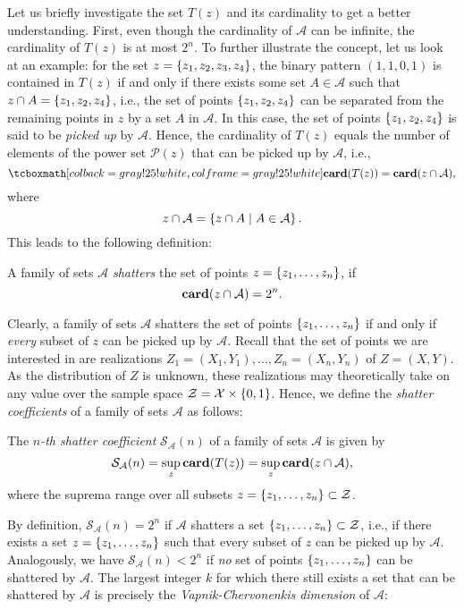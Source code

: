 Let us briefly investigate the set $T(z)$ and its cardinality to get a better understanding. First, even though the cardinality of $\mathcal{A}$ can be infinite, the cardinality of $T(z)$ is at most $2^n$. To further illustrate the concept, let us look at an example: for the set $z = \left\{z_1, z_2, z_3, z_4\right\}$, the binary pattern $(1, 1, 0, 1)$ is contained in $T(z)$ if and only if there exists some set $A \in \mathcal{A}$ such that $z \cap A = \left\{z_1, z_2, z_4\right\}$, i.e., the set of points $\left\{z_1, z_2, z_4\right\}$ can be separated from the remaining points in $z$ by a set $A$ in $\mathcal{A}$. In this case, the set of points $\left\{z_1, z_2, z_4\right\}$ is said to be \emph{picked up} by $\mathcal{A}$. Hence, the cardinality of $T(z)$ equals the number of elements of the power set $\mathcal{P}(z)$ that can be picked up by $\mathcal{A}$, i.e.,
\[
    \highlightMath{
        \card{T(z)} = \card{z \cap \mathcal{A}},
    }
\]
where
\[
    z \cap \mathcal{A} = \left\{ z \cap A \mathrel{|} A \in \mathcal{A}\right\}.
\]
This leads to the following definition:

\begin{definition}
A family of sets $\mathcal{A}$ \emph{shatters} the set of points $z = \left\{z_1, \dots, z_n\right\}$, if
\[
    \mathrm{\mathbf{card}}(z \cap \mathcal{A}) = 2^n.
\]
\end{definition}

Clearly, a family of sets $\mathcal{A}$ shatters the set of points $\left\{z_1, \dots, z_n\right\}$ if and only if \emph{every} subset of $z$ can be picked up by $\mathcal{A}$. Recall that the set of points we are interested in are realizations $Z_1 = (X_1, Y_1), \dots, Z_n = (X_n, Y_n)$ of $Z = (X, Y)$. As the distribution of $Z$ is unknown, these realizations may theoretically take on any value over the sample space $\mathcal{Z} = \mathcal{X} \times \left\{0, 1\right\}$. Hence, we define the \emph{shatter coefficients} of a family of sets $\mathcal{A}$ as follows:

\begin{definition}
The \emph{$n$-th shatter coefficient} $\mathcal{S}_{\mathcal{A}}(n)$ of a family of sets $\mathcal{A}$ is given by
\[
    \mathcal{S}_{\mathcal{A}}(n) = \sup_z \mathrm{\mathbf{card}}(T(z)) = \sup_z \mathrm{\mathbf{card}}(z \cap \mathcal{A}),
\]
where the suprema range over all subsets $z = \left\{z_1, \dots, z_n\right\} \subset \mathcal{Z}$.
\end{definition}

By definition, $\mathcal{S}_{\mathcal{A}}(n) = 2^n$ if $\mathcal{A}$ shatters a set $\left\{z_1, \dots, z_n\right\} \subset \mathcal{Z}$, i.e., if there exists a set $z = \left\{z_1, \dots, z_n\right\}$ such that every subset of $z$ can be picked up by $\mathcal{A}$. Analogously, we have $\mathcal{S}_{\mathcal{A}}(n) < 2^n$ if \emph{no} set of points $\left\{z_1, \dots, z_n\right\}$ can be shattered by $\mathcal{A}$. The largest integer $k$ for which there still exists a set that can be shattered by $\mathcal{A}$ is precisely the \emph{Vapnik-Chervonenkis dimension} of $\mathcal{A}$:

